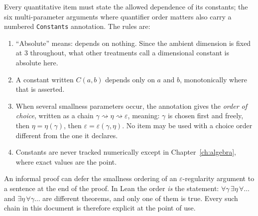 \begin{convention}[Constants]\label{conv:constants}
Every quantitative item must state the allowed dependence of its constants;
the six multi-parameter arguments where quantifier order matters also carry a
numbered \texttt{Constants} annotation.  The rules are:
\begin{enumerate}[label=(\alph*)]
\item ``Absolute'' means: depends on nothing.  Since the ambient dimension is
  fixed at $3$ throughout, what other treatments call a dimensional constant
  is absolute here.
\item A constant written $C(a,b)$ depends only on $a$ and $b$, monotonically
  where that is asserted.
\item When several smallness parameters occur, the annotation gives the
  \emph{order of choice}, written as a chain
  $\gamma\rightsquigarrow\eta\rightsquigarrow\varepsilon$, meaning: $\gamma$
  is chosen first and freely, then $\eta=\eta(\gamma)$, then
  $\varepsilon=\varepsilon(\gamma,\eta)$.  No item may be used with a choice
  order different from the one it declares.
\item Constants are never tracked numerically except in
  Chapter~\ref{ch:algebra}, where exact values are the point.
\end{enumerate}
\end{convention}

\begin{fnote}\label{fnote:order}
An informal proof can defer the smallness ordering of an
$\varepsilon$-regularity argument to a sentence at the end of the proof.  In
Lean the order \emph{is} the statement:
$\forall\gamma\,\exists\eta\,\forall\dots$ and
$\exists\eta\,\forall\gamma\dots$ are different theorems, and only one of
them is true.  Every such chain in this document is therefore explicit at the
point of use.
\end{fnote}

